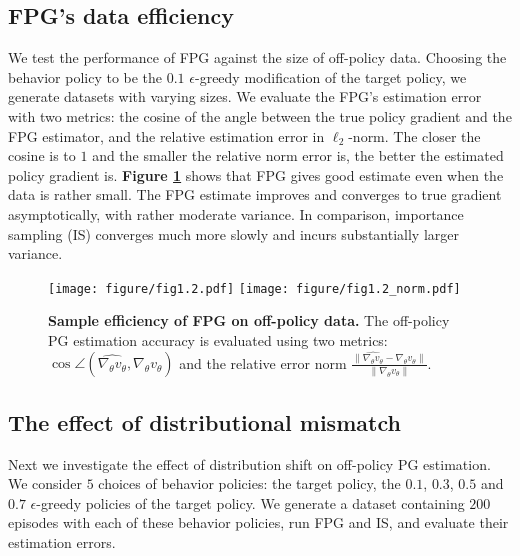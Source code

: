 \documentclass{article}
\numberwithin{equation}{section}
\begin{document}
\subsection{FPG's data efficiency}
\label{sec:exp-K}
We test the performance of FPG against the size of off-policy data. Choosing the behavior policy to be the $0.1$ $\epsilon$-greedy modification of the target policy, we generate datasets with varying sizes.  We evaluate the FPG's estimation error with two metrics: the cosine of the angle between the true policy gradient and the FPG estimator, and the relative estimation error in $\ell_2$-norm. The closer the cosine is to $1$ and the smaller the relative norm error is, the better the estimated policy gradient is.  
\textbf{Figure \ref{fig:FrozenLake_1}} shows that FPG gives good estimate even when the data is rather small. The FPG estimate improves and converges to true gradient asymptotically, with rather moderate variance. 
In comparison, importance sampling (IS) converges much more slowly and incurs substantially larger variance. 

\def\grad{\nabla}
\def\hat{\widehat}
\begin{figure}[!t]
 \centering
 \texttt{[image: figure/fig1.2.pdf]}
  \texttt{[image: figure/fig1.2\_norm.pdf]}
\caption{\textbf{Sample efficiency of FPG on off-policy data.} The off-policy PG estimation accuracy is evaluated using two metrics: $\cos\angle (\hat{\grad_\theta v_{\theta}}, \grad_\theta v_{\theta})$ and the relative error norm $\frac{\| \hat{\grad_\theta v_{\theta}} -  \grad_\theta v_{\theta}\| }{\|\grad_\theta v_{\theta}\|}$. }
\label{fig:FrozenLake_1}
\end{figure}

\subsection{The effect of distributional mismatch} 
\label{sec:exp-mismatch}
Next we investigate the effect of distribution shift on off-policy PG estimation. 
We consider $5$ choices of behavior policies: the target policy, the $0.1$, $0.3$, $0.5$ and $0.7$ $\epsilon$-greedy policies of the target policy. We generate a dataset containing $200$ episodes with each of these behavior policies, run FPG and IS, and evaluate their estimation errors.
\end{document}
